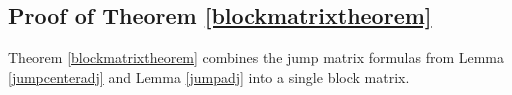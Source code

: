 \documentclass[thesis.tex]{subfiles}
\begin{document}
\subsection{Proof of Theorem \ref{blockmatrixtheorem}}

Theorem \ref{blockmatrixtheorem} combines the jump matrix formulas from Lemma \ref{jumpcenteradj} and Lemma \ref{jumpadj} into a single block matrix.

\iffulldocument\else
	
	
\fi
\end{document}
